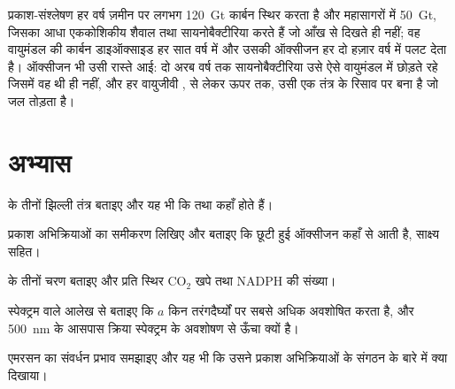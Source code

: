 \begin{example}[वैश्विक बजट]\label{ex:b1:photosynthesis:global}
प्रकाश-संश्लेषण हर वर्ष ज़मीन पर लगभग \qty{120}{Gt} कार्बन स्थिर करता है
और महासागरों में \qty{50}{Gt}, जिसका आधा एककोशिकीय शैवाल तथा
सायनोबैक्टीरिया करते हैं जो आँख से दिखते ही नहीं; वह वायुमंडल की कार्बन
डाइऑक्साइड हर सात वर्ष में और उसकी ऑक्सीजन हर दो हज़ार वर्ष में पलट देता
है। ऑक्सीजन भी उसी रास्ते आई: दो अरब वर्ष तक सायनोबैक्टीरिया उसे ऐसे
वायुमंडल में छोड़ते रहे जिसमें वह थी ही नहीं, और हर वायुजीवी ,
 से लेकर ऊपर तक, उसी एक  तंत्र के रिसाव पर बना है जो जल
तोड़ता है।
\end{example}

\section{अभ्यास}

\begin{exercise}[$\star$]\label{exo:b1:photosynthesis:1}
 के तीनों झिल्ली तंत्र बताइए और यह भी कि  तथा
 कहाँ होते हैं।
\end{exercise}

\begin{exercise}[$\star$]\label{exo:b1:photosynthesis:2}
प्रकाश अभिक्रियाओं का समीकरण लिखिए और बताइए कि छूटी हुई ऑक्सीजन कहाँ से
आती है, साक्ष्य सहित।
\end{exercise}

\begin{exercise}[$\star$]\label{exo:b1:photosynthesis:3}
 के तीनों चरण बताइए और प्रति स्थिर $\mathrm{CO_2}$ खपे 
तथा NADPH की संख्या।
\end{exercise}

\begin{exercise}[$\star$]\label{exo:b1:photosynthesis:4}
स्पेक्ट्रम वाले आलेख से बताइए कि  $a$ किन तरंगदैर्घ्यों पर सबसे
अधिक अवशोषित करता है, और \qty{500}{nm} के आसपास क्रिया स्पेक्ट्रम
 के अवशोषण से ऊँचा क्यों है।
\end{exercise}

\begin{exercise}[$\star\star$]\label{exo:b1:photosynthesis:5}
एमरसन का संवर्धन प्रभाव समझाइए और यह भी कि उसने प्रकाश अभिक्रियाओं के
संगठन के बारे में क्या दिखाया।
\end{exercise}

